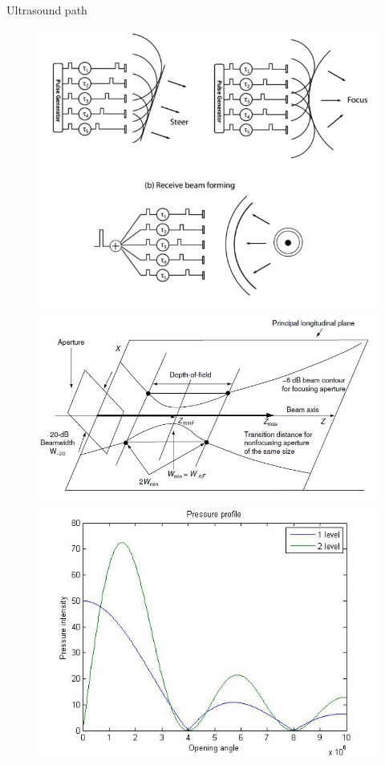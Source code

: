 \documentclass[t,12pt,english
\ifx\beamermode\undefined\else,\beamermode\fi
]{beamer}
\begin{document}
\begin{frame}{Ultrasound path}
\begin{figure}[!htb]
\includegraphics[width=.7\textwidth]{20.jpg}\\
\includegraphics[width=.4\textwidth]{24.jpg}\\
\includegraphics[width=.4\textwidth]{25.jpg}\\

\endminipage
\end{figure}

\end{frame}
\end{document}
